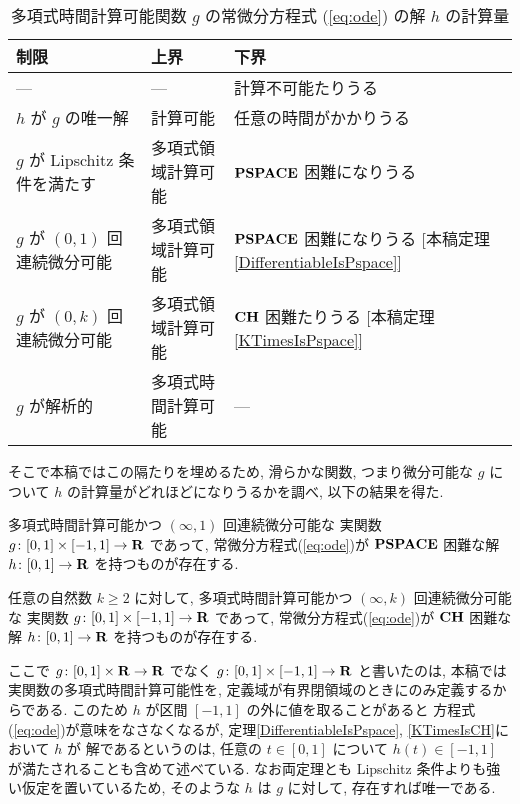 \begin{table}
\renewcommand\arraystretch{1.3}
\begin{center}
 \caption{多項式時間計算可能関数 $g$ の常微分方程式 (\ref{eq:ode}) の解 $h$ の計算量}
 \label{table:related}
 \begin{tabular}{lll}
  制限 & 上界 & 下界 \\
  \hline
   --- & --- & 計算不可能たりうる \cite{pour1979computable} \\
  $h$ が $g$ の唯一解 & 計算可能 \cite{coddington1955theory}
  & 任意の時間がかかりうる \cite{ko1983computational, miller1970recursive} \\
  $g$ が Lipschitz 条件を満たす & 多項式領域計算可能
      &	$\mathbf{PSPACE}$ 困難になりうる \cite{kawamura2010lipschitz}\\
  $g$ が $(0, 1)$ 回連続微分可能 & 多項式領域計算可能 & \parbox[t]{14zw}{$\mathbf{PSPACE}$ 困難になりうる\\{}[本稿定理\ref{DifferentiableIsPspace}]} \\
  $g$ が $(0, k)$ 回連続微分可能 & 多項式領域計算可能 & \parbox[t]{14zw}{$\mathbf{CH}$ 困難たりうる\\{}[本稿定理\ref{KTimesIsPspace}]} \\
  $g$ が解析的 
  & 多項式時間計算可能 \cite{ko1988computing, kawamura2010complexity} 
  & ---
 \end{tabular}
\end{center}
\end{table}

そこで本稿ではこの隔たりを埋めるため, 滑らかな関数, 
つまり微分可能な $g$ について $h$ の計算量がどれほどになりうるかを調べ,
以下の結果を得た.

 \begin{theorem}
  \label{DifferentiableIsPspace}
  多項式時間計算可能かつ $(\infty, 1)$ 回連続微分可能な
  実関数 $g \colon [0,1] \times [-1,1] \to \mathbf R$ であって, 
  常微分方程式(\ref{eq:ode})が
  $\mathbf{PSPACE}$ 困難な解 $h \colon [0, 1] \to \mathbf R$ を持つものが存在する.
 \end{theorem}

 \begin{theorem}
  \label{KTimesIsCH}
  任意の自然数 $k \ge 2$ に対して, 
  多項式時間計算可能かつ $(\infty, k)$ 回連続微分可能な
  実関数 $g \colon [0,1] \times [-1,1] \to \mathbf R$ であって, 
  常微分方程式(\ref{eq:ode})が
  $\mathbf{CH}$ 困難な解 $h \colon [0, 1] \to \mathbf R$ を持つものが存在する.
 \end{theorem}

ここで $g \colon [0,1] \times \mathbf R \to \mathbf R$ でなく
$g \colon [0,1] \times [-1, 1] \to \mathbf R$ と書いたのは, 
本稿では実関数の多項式時間計算可能性を, 
定義域が有界閉領域のときにのみ定義するからである. 
このため $h$ が区間 $[-1, 1]$ の外に値を取ることがあると
方程式(\ref{eq:ode})が意味をなさなくなるが, 
定理\ref{DifferentiableIsPspace}, \ref{KTimesIsCH}において $h$ が
解であるというのは, 
任意の $t \in [0, 1]$ について $h (t) \in [-1, 1]$ が満たされることも含めて述べている.
なお両定理とも Lipschitz 条件よりも強い仮定を置いているため, 
そのような $h$ は $g$ に対して, 存在すれば唯一である. 

